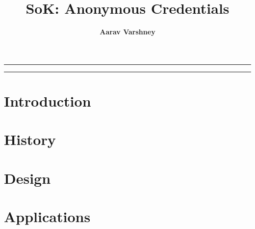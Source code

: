 \documentclass{article}
\author[1]{\textbf{Aarav Varshney}}
\affil[1]{\textbf{Ashoka University}, \texttt{aarav.varshney@alumni.ashoka.edu.in}}
\title{\textbf{\huge SoK: Anonymous Credentials}\\}
\date{}
\begin{document}
\pagestyle{headings}	
\newpage
\setcounter{page}{1}
\renewcommand{\thepage}{\arabic{page}}


	
\setlength{\parskip}{0.5em}
	
\maketitle
	
\noindent\rule{15cm}{0.5pt}
	\begin{abstract}
        
	\end{abstract}
\noindent\rule{15cm}{0.4pt}

\section{Introduction}

\section{History}

\section{Design}

\section{Applications}





\end{document}
